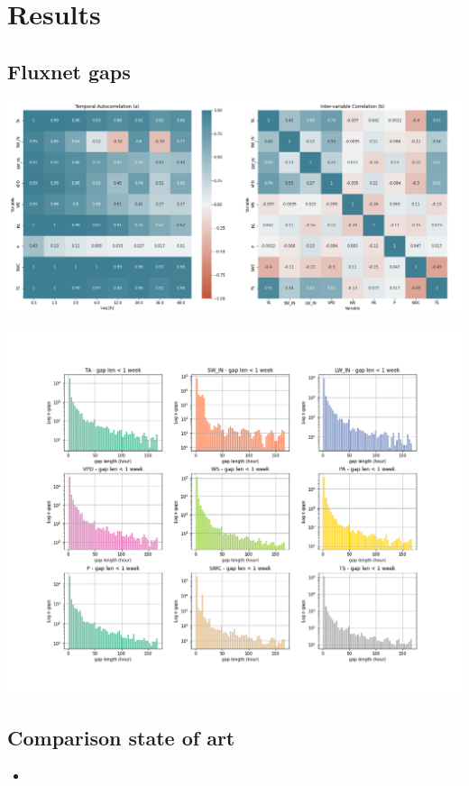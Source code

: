 \documentclass{article}
\let\Oldsection\section
\renewcommand{\section}{\FloatBarrier\Oldsection}
\let\Oldsubsection\subsection
\renewcommand{\subsection}{\FloatBarrier\Oldsubsection}
\begin{document}
\section{Results}

\subsection{Fluxnet gaps}

\includegraphics[width=\textwidth]{correlation}

\includegraphics[width=\textwidth]{gap_len_dist_small}

\subsection{Comparison state of art}

\begin{itemize}
    \item 
\end{itemize}
\end{document}
